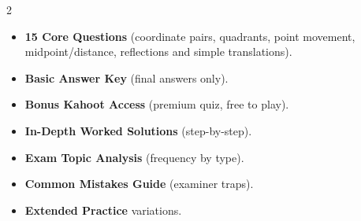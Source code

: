 \documentclass[11pt,a4paper]{article}
\newcommand{\FullReleaseDate}{April 30, 2026}
\begin{document}
\vspace{8pt}

\begin{multicols}{2}
  \begin{tcolorbox}[card, title=\sffamily\bfseries\textcolor{white}{\faHandPointDown\ TODAY (Simplified Version)}, colbacktitle=mainblue, boxed title style={sharp corners, boxrule=0pt}]
    \begin{itemize}[leftmargin=1.2em, itemsep=2pt]
      \item \small \textbf{15 Core Questions} (coordinate pairs, quadrants, point movement, midpoint/distance, reflections and simple translations).
      \item \small \textbf{Basic Answer Key} (final answers only).
      \item \small \textbf{Bonus Kahoot Access} (premium quiz, free to play).
    \end{itemize}
  \end{tcolorbox}

  \columnbreak

  \begin{tcolorbox}[card, title=\sffamily\bfseries\textcolor{white}{\faRocket\ ON \FullReleaseDate\ (Full Upgrade)}, colbacktitle=mainblue, boxed title style={sharp corners, boxrule=0pt}]
    \begin{itemize}[leftmargin=1.2em, itemsep=2pt]
      \item \small \textbf{In-Depth Worked Solutions} (step-by-step).
      \item \small \textbf{Exam Topic Analysis} (frequency by type).
      \item \small \textbf{Common Mistakes Guide} (examiner traps).
      \item \small \textbf{Extended Practice} variations.
    \end{itemize}
  \end{tcolorbox}
\end{multicols}
\end{document}
